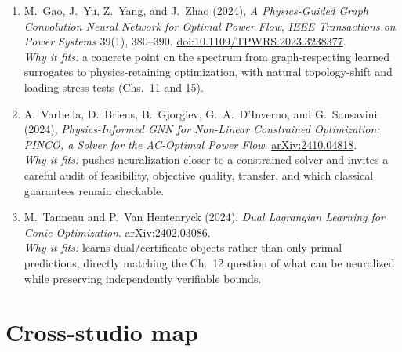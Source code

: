 \documentclass[11pt]{article}
\begin{document}
\begin{enumerate}[leftmargin=1.7em,itemsep=5pt]
    \item M.~Gao, J.~Yu, Z.~Yang, and J.~Zhao (2024), \emph{A Physics-Guided Graph Convolution Neural Network for Optimal Power Flow}, \emph{IEEE Transactions on Power Systems} 39(1), 380--390. \href{https://doi.org/10.1109/TPWRS.2023.3238377}{doi:10.1109/TPWRS.2023.3238377}.\\
    \textcolor{UAgray}{\emph{Why it fits:} a concrete point on the spectrum from graph-respecting learned surrogates to physics-retaining optimization, with natural topology-shift and loading stress tests (Chs.~11 and 15).}

    \item A.~Varbella, D.~Briens, B.~Gjorgiev, G.~A.~D'Inverno, and G.~Sansavini (2024), \emph{Physics-Informed GNN for Non-Linear Constrained Optimization: PINCO, a Solver for the AC-Optimal Power Flow}. \href{https://arxiv.org/abs/2410.04818}{arXiv:2410.04818}.\\
    \textcolor{UAgray}{\emph{Why it fits:} pushes neuralization closer to a constrained solver and invites a careful audit of feasibility, objective quality, transfer, and which classical guarantees remain checkable.}

    \item M.~Tanneau and P.~Van Hentenryck (2024), \emph{Dual Lagrangian Learning for Conic Optimization}. \href{https://arxiv.org/abs/2402.03086}{arXiv:2402.03086}.\\
    \textcolor{UAgray}{\emph{Why it fits:} learns dual/certificate objects rather than only primal predictions, directly matching the Ch.~12 question of what can be neuralized while preserving independently verifiable bounds.}
\end{enumerate}


\section*{Cross-studio map}
\end{document}
